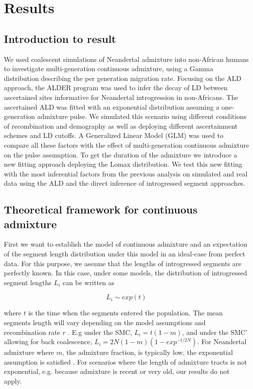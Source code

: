 \documentclass[]{article}
\begin{document}
\section{Results}\label{results}

\subsection{Introduction to result}\label{introduction to result}

We used coalescent simulations of Neandertal admixture into non-African humans to investigate multi-generation continuous admixture, using a Gamma distribution describing the per generation migration rate. Focusing on the ALD approach, the ALDER program was used to infer the decay of LD between ascertained sites informative for Neandertal introgression in non-Africans. The ascertained ALD was fitted with an exponential distribution assuming a one-generation admixture pulse.  We simulated this scenario using different conditions of recombination and demography as well as deploying different ascertainment schemes and LD cutoffs. A Generalized Linear Model (GLM) was used to compare all these factors with the effect of multi-generation continuous admixture on the pulse assumption. To get the duration of the admixture we introduce a new fitting approach deploying the Lomax distribution. We test this new fitting with the most inferential factors from the previous analysis on simulated and real data using the ALD and the direct inference of introgressed segment approaches.

\subsection{Theoretical framework for continuous admixture}\label{theoretical framework for continuous admixture}

First we want to establish the model of continuous admixture and an
expectation of the segment length distribution under this model in an
ideal-case from perfect data. For this purpose, we assume that the
lengths of introgressed segments are perfectly known. In this case, under
some models, the distribution of introgressed segment lengths \(L_i\) can
be written as

\begin{equation}
L_i \sim exp(t)
\end{equation}

where $t$ is the time when the segments entered the population. The mean segments length will vary  depending on the model assumptions and
recombination rate \(r\) \citep{liang_lengths_2014}. E.g under the SMC,
\(L_i = t(1-m)\), and under the SMC' allowing for back coalescence,
\(L_i = 2N(1-m)(1-exp^{-t/2N})\). For Neandertal admixture where
\(m\), the admixture fraction, is typically low, the exponential
assumption is satisfied \citep{liang_lengths_2014}. For scenarios where
the length of admixture tracts is not exponential, e.g. because
admixture is recent or very old, our results do not apply.
\end{document}
